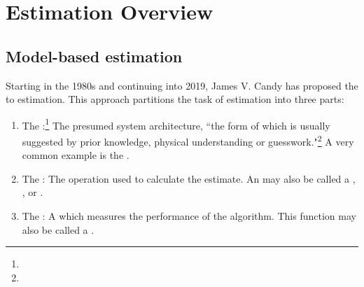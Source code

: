 
\chapter{Estimation Overview}
\label{app:est}
\label{chp:est}
\section{Model-based estimation}
\label{sec:model-based}
Starting in the 1980s and continuing into 2019, James V. Candy has proposed 
the  
to estimation. This approach partitions the task of estimation into three parts:
\begin{enumerate}
  \item The :\footnote{
          }
        The presumed system architecture,
        ``the form of which is usually suggested by prior knowledge, 
        physical understanding or guesswork."\footnote{}
        A very common example is the .
  \item The : 
        The operation used to calculate the estimate.
        An  may also be called a ,
        , or .
  \item The : 
        A  which measures the performance
        of the algorithm.
        This function may also be called a . 
\end{enumerate}
